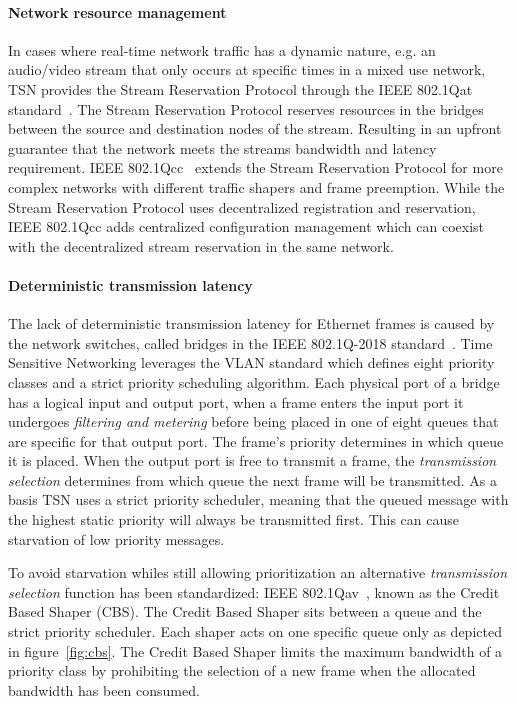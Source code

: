 \paragraph{Network resource management} In cases where real-time network traffic has a dynamic nature, e.g. an audio/video stream that only occurs at specific times in a mixed use network, TSN provides the Stream Reservation Protocol through the IEEE 802.1Qat standard~\cite{IEEE8021Qat}. The Stream Reservation Protocol reserves resources in the bridges between the source and destination nodes of the stream. Resulting in an upfront guarantee that the network meets the streams bandwidth and latency requirement. IEEE 802.1Qcc~\cite{IEEE8021Qcc} extends the Stream Reservation Protocol for more complex networks with different traffic shapers and frame preemption. While the Stream Reservation Protocol uses decentralized registration and reservation, IEEE 802.1Qcc adds centralized configuration management which can coexist with the decentralized stream reservation in the same network.

\paragraph{Deterministic transmission latency} The lack of deterministic transmission latency for Ethernet frames is caused by the network switches, called bridges in the IEEE 802.1Q-2018 standard~\cite{IEEE8021Q}. Time Sensitive Networking leverages the VLAN standard which defines eight priority classes and a strict priority scheduling algorithm. Each physical port of a bridge has a logical input and output port, when a frame enters the input port it undergoes \textit{filtering and metering} before being placed in one of eight queues that are specific for that output port. The frame's priority determines in which queue it is placed. When the output port is free to transmit a frame, the \textit{transmission selection} determines from which queue the next frame will be transmitted. As a basis TSN uses a strict priority scheduler, meaning that the queued message with the highest static priority will always be transmitted first. This can cause starvation of low priority messages.

To avoid starvation whiles still allowing prioritization an alternative \textit{transmission selection} function has been standardized: IEEE 802.1Qav~\cite{IEEE8021Qav}, known as the Credit Based Shaper (CBS). The Credit Based Shaper sits between a queue and the strict priority scheduler. Each shaper acts on one specific queue only as depicted in figure~\ref{fig:cbs}. The Credit Based Shaper limits the maximum bandwidth of a priority class by prohibiting the selection of a new frame when the allocated bandwidth has been consumed. 

